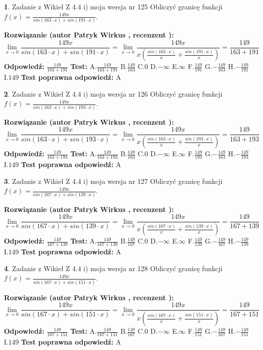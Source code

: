 \documentclass[12pt, a4paper]{article}
\theoremstyle{definition} %
\newtheorem{zad}{}
\newcommand{\zadStart}[1]{\begin{zad}#1\newline}
\newcommand{\zadStop}{\end{zad}}
\newcommand{\rozwStart}[2]{\noindent \textbf{Rozwiązanie (autor #1 , recenzent #2): }\newline}
\newcommand{\rozwStop}{\newline}
\newcommand{\odpStart}{\noindent \textbf{Odpowiedź:}\newline}
\newcommand{\odpStop}{\newline}
\newcommand{\testStart}{\noindent \textbf{Test:}\newline}
\newcommand{\testStop}{\newline}
\newcommand{\kluczStart}{\noindent \textbf{Test poprawna odpowiedź:}\newline}
\newcommand{\kluczStop}{\newline}
\begin{document}
\zadStart{Zadanie z Wikieł Z 4.4 i) moja wersja nr 125}
Obliczyć granicę funkcji $f(x)=\frac{149x}{sin(163\cdot x) +sin(191\cdot x)}$.
\zadStop
\rozwStart{Patryk Wirkus}{}
$$\lim\limits_{x\to 0}\frac{149x}{sin(163\cdot x) +sin(191\cdot x)}=\lim\limits_{x\to 0}\frac{149x}{x(\frac{sin(163\cdot x)}{x}+\frac{sin(191\cdot x)}{x})}=\frac{149}{163+191}$$
\rozwStop
\odpStart
$\frac{149}{163+191}$
\odpStop
\testStart
A.$\frac{149}{163+191}$
B.$\frac{149}{163}$
C.$0$
D.$-\infty$
E.$\infty$
F.$\frac{149}{191}$
G.$-\frac{149}{163}$
H.$-\frac{149}{191}$
I.$149$
\testStop
\kluczStart
A
\kluczStop



\zadStart{Zadanie z Wikieł Z 4.4 i) moja wersja nr 126}
Obliczyć granicę funkcji $f(x)=\frac{149x}{sin(163\cdot x) +sin(193\cdot x)}$.
\zadStop
\rozwStart{Patryk Wirkus}{}
$$\lim\limits_{x\to 0}\frac{149x}{sin(163\cdot x) +sin(193\cdot x)}=\lim\limits_{x\to 0}\frac{149x}{x(\frac{sin(163\cdot x)}{x}+\frac{sin(193\cdot x)}{x})}=\frac{149}{163+193}$$
\rozwStop
\odpStart
$\frac{149}{163+193}$
\odpStop
\testStart
A.$\frac{149}{163+193}$
B.$\frac{149}{163}$
C.$0$
D.$-\infty$
E.$\infty$
F.$\frac{149}{193}$
G.$-\frac{149}{163}$
H.$-\frac{149}{193}$
I.$149$
\testStop
\kluczStart
A
\kluczStop



\zadStart{Zadanie z Wikieł Z 4.4 i) moja wersja nr 127}
Obliczyć granicę funkcji $f(x)=\frac{149x}{sin(167\cdot x) +sin(139\cdot x)}$.
\zadStop
\rozwStart{Patryk Wirkus}{}
$$\lim\limits_{x\to 0}\frac{149x}{sin(167\cdot x) +sin(139\cdot x)}=\lim\limits_{x\to 0}\frac{149x}{x(\frac{sin(167\cdot x)}{x}+\frac{sin(139\cdot x)}{x})}=\frac{149}{167+139}$$
\rozwStop
\odpStart
$\frac{149}{167+139}$
\odpStop
\testStart
A.$\frac{149}{167+139}$
B.$\frac{149}{167}$
C.$0$
D.$-\infty$
E.$\infty$
F.$\frac{149}{139}$
G.$-\frac{149}{167}$
H.$-\frac{149}{139}$
I.$149$
\testStop
\kluczStart
A
\kluczStop



\zadStart{Zadanie z Wikieł Z 4.4 i) moja wersja nr 128}
Obliczyć granicę funkcji $f(x)=\frac{149x}{sin(167\cdot x) +sin(151\cdot x)}$.
\zadStop
\rozwStart{Patryk Wirkus}{}
$$\lim\limits_{x\to 0}\frac{149x}{sin(167\cdot x) +sin(151\cdot x)}=\lim\limits_{x\to 0}\frac{149x}{x(\frac{sin(167\cdot x)}{x}+\frac{sin(151\cdot x)}{x})}=\frac{149}{167+151}$$
\rozwStop
\odpStart
$\frac{149}{167+151}$
\odpStop
\testStart
A.$\frac{149}{167+151}$
B.$\frac{149}{167}$
C.$0$
D.$-\infty$
E.$\infty$
F.$\frac{149}{151}$
G.$-\frac{149}{167}$
H.$-\frac{149}{151}$
I.$149$
\testStop
\kluczStart
A
\kluczStop
\end{document}
